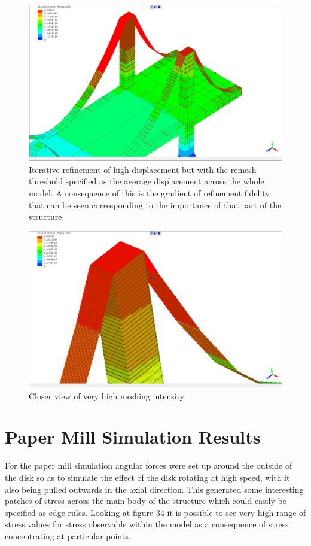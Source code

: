 \begin{figure}[H]
  \centerline{\includegraphics[width=165mm, scale=0.5]{../Graphics/BridgeCrossLoading/aboveAverageRefinement2.png}}
  \caption{Iterative refinement of high displacement but with the remesh threshold specified as the average displacement across the whole model. A consequence of this is the gradient of refinement fidelity that can be seen corresponding to the importance of that part of the structure}
\end{figure}


\begin{figure}[H]
  \centerline{\includegraphics[width=165mm, scale=0.5]{../Graphics/BridgeCrossLoading/aboveAverageRefinement.png}}
  \caption{Closer view of very high meshing intensity}
\end{figure}

\newpage
\section{Paper Mill Simulation Results}
For the paper mill simulation angular forces were set up around the outside of the disk so as to simulate the effect of the disk rotating at high speed, with it also being pulled outwards in the axial direction. This generated some interesting patches of stress across the main body of the structure which could easily be specified as edge rules. Looking at figure 34 it is possible to see very high range of stress values for stress observable within the model as a consequence of stress concentrating at particular points.

